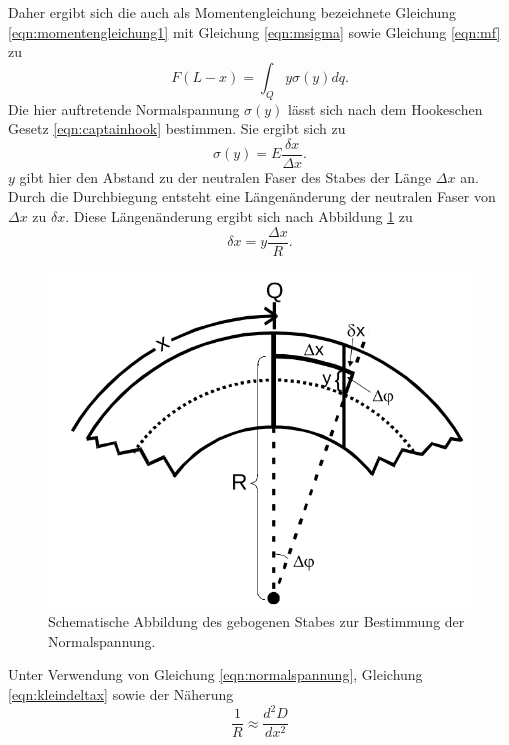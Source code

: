 Daher ergibt sich die auch als Momentengleichung bezeichnete Gleichung \eqref{eqn:momentengleichung1}
mit Gleichung \eqref{eqn:msigma} sowie Gleichung \eqref{eqn:mf} zu
\begin{equation}
  F(L - x) = \int_Q  y \sigma(y) dq.
  \label{eqn:momentengleichung2}
\end{equation}
Die hier auftretende Normalspannung $\sigma(y)$ lässt sich nach dem Hookeschen Gesetz \eqref{eqn:captainhook} bestimmen.
Sie ergibt sich zu
\begin{equation}
  \sigma(y) = E \frac{\delta x}{\Delta x}.
  \label{eqn:normalspannung}
\end{equation}
$y$ gibt hier den Abstand zu der neutralen Faser des Stabes der Länge $\Delta x$ an.
Durch die Durchbiegung entsteht eine Längenänderung der neutralen Faser von $\Delta x$ zu $\delta x$.
Diese Längenänderung ergibt sich nach Abbildung \ref{fig:einspannungeinseitig2} zu
\begin{equation}
  \delta x = y \frac{\Delta x}{R}.
  \label{eqn:kleindeltax}
\end{equation}
\begin{figure}[H]
  \centering
  \includegraphics[scale=0.4]{content/EinspannungEinseitig2.png}
  \caption{Schematische Abbildung des gebogenen Stabes zur Bestimmung der Normalspannung. \cite{AP01}}
  \label{fig:einspannungeinseitig2}
\end{figure}
\noindent
Unter Verwendung von Gleichung \eqref{eqn:normalspannung}, Gleichung \eqref{eqn:kleindeltax} sowie der Näherung
\begin{equation*}
  \frac{1}{R} \approx \frac{d^2 D}{d x^2}
\end{equation*}
